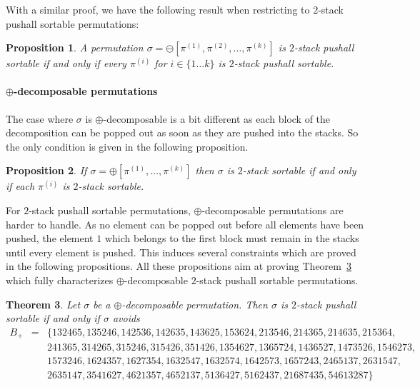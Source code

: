 \documentclass[11pt]{article}
\newtheorem{thm}{Theorem}[section]
\newtheorem{prop}[thm]{Proposition}
\newcommand{\pushall}{$2$-stack pushall sortable\xspace}
\begin{document}
With a similar proof, we have the following result when restricting to \pushall permutations:

\begin{prop}\label{prop:pushallMoinsDecomposable}
A permutation $\sigma = \ominus[\pi^{(1)},\pi^{(2)},\ldots, \pi^{(k)}]$ is \pushall if and only if every $\pi^{(i)}$ for $i \in \{ 1 \ldots k\}$ is $2$-stack pushall sortable.
\end{prop}

\paragraph{$\oplus$-decomposable permutations}

The case where $\sigma$ is $\oplus$-decomposable is a bit different as each block of the decomposition can be popped out as soon as they are pushed into the stacks. 
So the only condition is given in the following proposition.

\begin{prop}
If $\sigma = \oplus[\pi^{(1)},\ldots, \pi^{(k)}]$ then $\sigma$ is $2$-stack sortable if and only if each $\pi^{(i)}$ is $2$-stack sortable.
\end{prop}

For \pushall permutations, $\oplus$-decomposable permutations are harder to handle. 
As no element can be popped out before all elements have been pushed, the element $1$ which belongs to the first block must remain in the stacks until every element is pushed. 
This induces several constraints which are proved in the following propositions. 
All these propositions aim at proving Theorem~\ref{thm:+pt} which fully characterizes $\oplus$-decomposable \pushall permutations.

\begin{thm}
\label{thm:+pt}
Let $\sigma$ be a $\oplus$-decomposable permutation. Then $\sigma$ is \pushall if and only if $\sigma$ avoids
\begin{eqnarray*}
B_+ &=& \{ 132465, 135246, 142536, 142635, 143625, 153624, 213546, 214365, 214635, 215364, \\
&&241365, 314265, 315246, 315426, 351426, 1354627, 1365724, 1436527, 1473526 ,1546273, \\
&&1573246, 1624357, 1627354, 1632547, 1632574, 1642573, 1657243, 2465137, 2631547, \\
&&2635147, 3541627, 4621357, 4652137, 5136427, 5162437, 21687435, 54613287 \}
\end{eqnarray*}
\end{thm}
\end{document}
